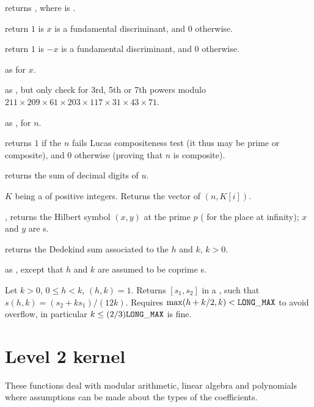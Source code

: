  returns , where
 is .

 return $1$ is $x$ is a fundamental
discriminant, and $0$ otherwise.

 return $1$ is $-x$ is a fundamental
discriminant, and $0$ otherwise.

 as 
for  $x$.

 as , but
only check for 3rd, 5th or 7th powers modulo
$211\times209\times61\times203\times117\times31\times43\times71$.

 as , for
 $n$.

 returns $1$ if the  $n$ fails Lucas
compositeness test (it thus may be prime or composite), and $0$ otherwise
(proving that $n$ is composite).

 returns the sum of decimal digits of $u$.

 $K$ being a  of
positive integers. Returns the vector of $(n, K[i])$.

, returns the Hilbert symbol
$(x,y)$ at the prime $p$ ( for the place at infinity); $x$ and $y$
are s.

 returns the Dedekind sum associated to
the  $h$ and $k$, $k > 0$.

 as , except
that $h$ and $k$ are assumed to be coprime s.

Let $k > 0$, $0 \leq h < k$, $(h,k) = 1$. Returns $[s_1,s_2]$
in a , such that $s(h,k) = (s_2 + k s_1) / (12k)$.
Requires $\max(h + k/2, k) < {\tt LONG\_MAX}$
to avoid overflow, in particular $k \leq (2/3){\tt LONG\_MAX}$ is fine.

\newpage
\chapter{Level 2 kernel}

These functions deal with modular arithmetic, linear algebra and polynomials
where assumptions can be made about the types of the coefficients.

